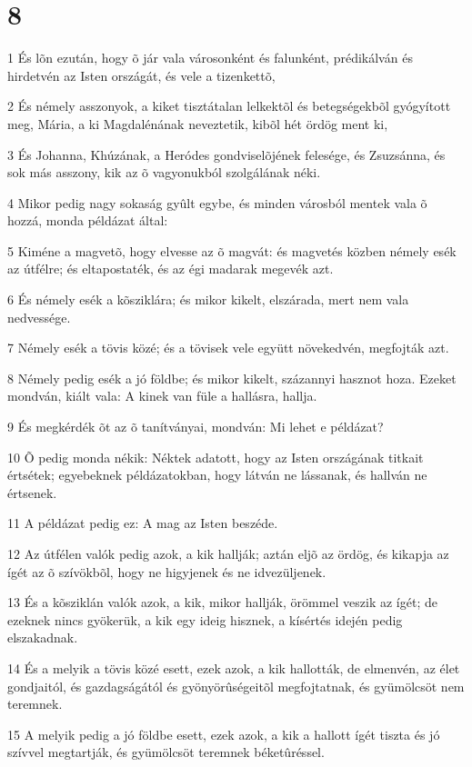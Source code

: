 \chapter{8}

\par 1 És lõn ezután, hogy õ jár vala városonként és falunként, prédikálván és hirdetvén az Isten országát, és vele a tizenkettõ,
\par 2 És némely asszonyok, a kiket tisztátalan lelkektõl és betegségekbõl gyógyított meg, Mária,  a ki Magdalénának neveztetik, kibõl hét ördög ment ki,
\par 3 És Johanna, Khúzának, a Heródes gondviselõjének felesége, és Zsuzsánna, és sok más asszony, kik az õ vagyonukból szolgálának néki.
\par 4 Mikor pedig nagy sokaság gyûlt egybe, és minden városból mentek vala õ hozzá, monda példázat által:
\par 5 Kiméne a magvetõ, hogy elvesse az õ magvát: és magvetés közben némely esék az útfélre; és eltapostaték, és az égi madarak megevék azt.
\par 6 És némely esék a kõsziklára; és mikor kikelt, elszárada, mert nem vala nedvessége.
\par 7 Némely esék a tövis közé; és a tövisek vele együtt növekedvén, megfojták azt.
\par 8 Némely pedig esék a jó földbe; és mikor kikelt, százannyi hasznot hoza. Ezeket mondván, kiált vala: A kinek van füle a hallásra, hallja.
\par 9 És megkérdék õt az õ tanítványai, mondván: Mi lehet e példázat?
\par 10 Õ pedig monda nékik: Néktek adatott, hogy az Isten országának titkait értsétek; egyebeknek példázatokban, hogy látván ne lássanak, és hallván ne értsenek.
\par 11 A példázat pedig ez: A mag az Isten beszéde.
\par 12 Az útfélen valók pedig azok, a kik hallják; aztán eljõ az ördög, és kikapja az ígét az õ szívökbõl, hogy ne higyjenek és ne idvezüljenek.
\par 13 És a kõsziklán valók azok, a kik, mikor hallják, örömmel veszik az ígét; de ezeknek nincs gyökerük, a kik egy ideig hisznek, a kísértés idején pedig elszakadnak.
\par 14 És a melyik a tövis közé esett, ezek azok, a kik hallották, de elmenvén, az élet gondjaitól, és gazdagságától és gyönyörûségeitõl megfojtatnak, és gyümölcsöt nem teremnek.
\par 15 A melyik pedig a jó földbe esett, ezek azok, a kik a hallott ígét tiszta és jó szívvel megtartják, és gyümölcsöt teremnek béketûréssel.
